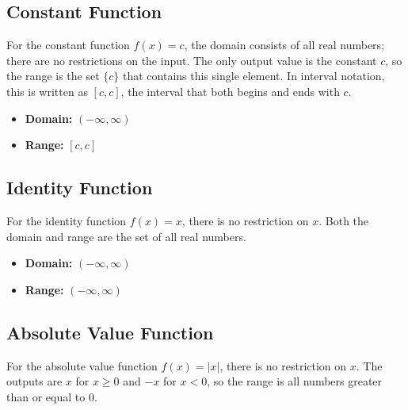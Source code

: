 \subsection{Constant Function}
\label{sss:cons-6354}

For the constant function $f(x) = c$, the domain consists of all real numbers; there are no restrictions on the input. The only output value is the constant $c$, so the range is the set $\{c\}$ that contains this single element. In interval notation, this is written as $[c, c]$, the interval that both begins and ends with $c$.


\begin{itemize}
    \item \textbf{Domain:} $(-\infty ,\infty)$
    \item \textbf{Range:} $[c, c]$
\end{itemize}

\subsection{Identity Function}
\label{sss:iden-48e9}

For the identity function $f(x) = x$, there is no restriction on $x$. Both the domain and range are the set of all real numbers.


\begin{itemize}
    \item \textbf{Domain:} $(-\infty ,\infty)$
    \item \textbf{Range:} $(-\infty ,\infty)$
\end{itemize}

\subsection{Absolute Value Function}
\label{sss:abso-ffeb}

For the absolute value function $f(x) = |x|$, there is no restriction on $x$. The outputs are $x$ for $x \geq 0$ and $-x$ for $x < 0$, so the range is all numbers greater than or equal to 0.

